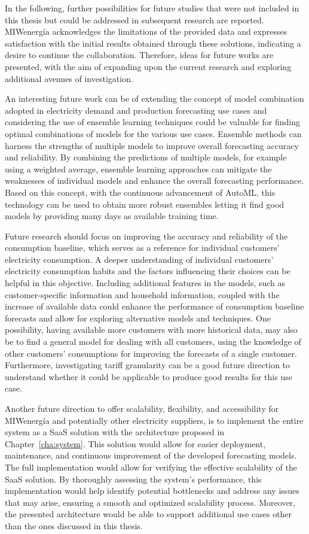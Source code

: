 In the following, further possibilities for future studies that were not included in this thesis but could be addressed in subsequent research are reported.
MIWenergía acknowledges the limitations of the provided data and expresses satisfaction with the initial results obtained through these solutions, indicating a desire to continue the collaboration.
Therefore, ideas for future works are presented, with the aim of expanding upon the current research and exploring additional avenues of investigation.

An interesting future work can be of extending the concept of model combination adopted in electricity demand and production forecasting use cases and considering the use of ensemble learning techniques could be valuable for finding optimal combinations of models for the various use cases.
Ensemble methods can harness the strengths of multiple models to improve overall forecasting accuracy and reliability.
By combining the predictions of multiple models, for example using a weighted average, ensemble learning approaches can mitigate the weaknesses of individual models and enhance the overall forecasting performance.
Based on this concept, with the continuous advancement of AutoML, this technology can be used to obtain more robust ensembles letting it find good models by providing many days as available training time.

Future research should focus on improving the accuracy and reliability of the consumption baseline, which serves as a reference for individual customers' electricity consumption.
A deeper understanding of individual customers' electricity consumption habits and the factors influencing their choices can be helpful in this objective.
Including additional features in the models, such as customer-specific information and household information, coupled with the increase of available data could enhance the performance of consumption baseline forecasts and allow for exploring alternative models and techniques.
One possibility, having available more customers with more historical data, may also be to find a general model for dealing with all customers, using the knowledge of other customers' consumptions for improving the forecasts of a single customer.
Furthermore, investigating tariff granularity can be a good future direction to understand whether it could be applicable to produce good results for this use case.

Another future direction to offer scalability, flexibility, and accessibility for MIWenergía and potentially other electricity suppliers, is to implement the entire system as a SaaS solution with the architecture proposed in Chapter~\ref{cha:system}.
This solution would allow for easier deployment, maintenance, and continuous improvement of the developed forecasting models.
The full implementation would allow for verifying the effective scalability of the SaaS solution.
By thoroughly assessing the system's performance, this implementation would help identify potential bottlenecks and address any issues that may arise, ensuring a smooth and optimized scalability process.
Moreover, the presented architecture would be able to support additional use cases other than the ones discussed in this thesis.

